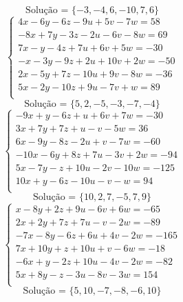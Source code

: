 \documentclass[12pt,oneside,a4paper]{article}
\begin{document}
\begin{equation*}
\text{Solução = }\{-3,-4,6,-10,7,6\}
\end{equation*}
\vspace{\baselineskip}
\begin{equation*}
\begin{cases}
4x-6y-6z-9u+5v-7w=58 \\
-8x+7y-3z-2u-6v-8w=69 \\
7x-y-4z+7u+6v+5w=-30 \\
-x-3y-9z+2u+10v+2w=-50 \\
2x-5y+7z-10u+9v-8w=-36 \\
5x-2y-10z+9u-7v+w=89 \\
\end{cases}
\end{equation*}
\begin{equation*}
\text{Solução = }\{5,2,-5,-3,-7,-4\}
\end{equation*}
\vspace{\baselineskip}
\begin{equation*}
\begin{cases}
-9x+y-6z+u+6v+7w=-30 \\
3x+7y+7z+u-v-5w=36 \\
6x-9y-8z-2u+v-7w=-60 \\
-10x-6y+8z+7u-3v+2w=-94 \\
5x-7y-z+10u-2v-10w=-125 \\
10x+y-6z-10u-v-w=94 \\
\end{cases}
\end{equation*}
\begin{equation*}
\text{Solução = }\{10,2,7,-5,7,9\}
\end{equation*}
\vspace{\baselineskip}
\begin{equation*}
\begin{cases}
x-8y+2z+9u-6v+6w=-65 \\
2x+2y+7z+7u-v-2w=-89 \\
-7x-8y-6z+6u+4v-2w=-165 \\
7x+10y+z+10u+v-6w=-18 \\
-6x+y-2z+10u-4v-2w=-82 \\
5x+8y-z-3u-8v-3w=154 \\
\end{cases}
\end{equation*}
\begin{equation*}
\text{Solução = }\{5,10,-7,-8,-6,10\}
\end{equation*}
\end{document}
